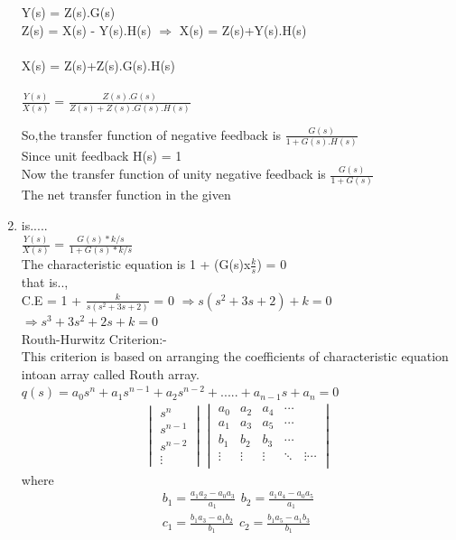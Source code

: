\documentclass[journal,12pt,twocolumn]{IEEEtran}
\renewcommand\thesection{\arabic{section}}
\begin{document}
\begin{enumerate}[label=\arabic*.,ref=\thesection.\theenumi]
Y(s) = Z(s).G(s)
\\ 
Z(s) = X(s) - Y(s).H(s) $\Rightarrow$ X(s) = Z(s)+Y(s).H(s)
\\ \\
X(s) = Z(s)+Z(s).G(s).H(s)
\\ \\
$\frac{Y(s)}{X(s)}$ = $\frac{Z(s).G(s)}{Z(s)+Z(s).G(s).H(s)}$

So,the transfer function of negative feedback is $\frac{G(s)}{1+G(s).H(s)}$
\\ Since unit feedback H(s) = 1
\\ Now the transfer function of unity negative feedback is $\frac{G(s)}{1+G(s)}$
\\
  The net transfer function in the given \item is.....
  \\
  
  $\frac{Y(s)}{X(s)}$ = $\frac{G(s)*k/s}{1+G(s)*k/s}$
  \\
  
  The characteristic equation is 1 + (G(s)x$\frac{k}{s}$) = 0
 \\ that is..,
 \\ 
 
 C.E = 1 + $\frac{k}{s(s^2+3s+2)}$ = 0
 $\Rightarrow s(s^2+3s+2) + k = 0$
 \\ 
 
$\Rightarrow s^3+3s^2+2s+k=0$
\\Routh-Hurwitz  Criterion:-\\

{}
 This criterion is based on arranging the coefficients of characteristic equation intoan array called Routh array.
\\ 
$ q(s) = a_0s^n+a_1s^{n-1}+a_2s^{n-2}+.....+a_{n-1}s+a_n = 0$
\\ 
\begin{align}
\begin{vmatrix}s^n\\s^{n-1}\\s^{n-2} \\ \vdots \end{vmatrix} \begin{vmatrix}
a_0 & a_2 & a_4 & \cdots \\
a_1 & a_3 & a_5 & \cdots  \\
b_1 & b_2 & b_3 & \cdots \\
\vdots & \vdots & \vdots & \ddots &\vdots 
 \cdots \\ \end{vmatrix} 
\end{align}
  where 
\begin{align}
b_1 =\frac{ a_1a_2-a_0a_3}{a_1}  \hspace{5pt} b_2 =\frac{ a_1a_4-a_0a_5}{a_1} \\ c_1=\frac{ b_1a_3-a_1b_2}{b_1}  \hspace{5pt}     c_2=\frac{ b_1a_5-a_1b_3}{b_1}  
\end{align}


\end{enumerate}
\end{document}

